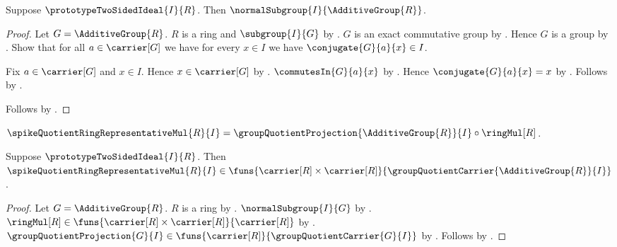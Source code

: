 \begin{proposition}\label{spike_two_sided_ideal_is_normal}
    Suppose $\prototypeTwoSidedIdeal{I}{R}$.
    Then $\normalSubgroup{I}{\AdditiveGroup{R}}$.
\end{proposition}
\begin{proof}
    Let $G=\AdditiveGroup{R}$.
    $R$ is a ring and $\subgroup{I}{G}$ by
        .
    $G$ is an exact commutative group by
        .
    Hence $G$ is a group by .
    Show that for all $a\in\carrier[G]$ we have for every $x\in I$ we have
        $\conjugate{G}{a}{x}\in I$.
    \begin{subproof}
        Fix $a\in\carrier[G]$ and $x\in I$.
        Hence $x\in\carrier[G]$ by
            .
        $\commutesIn{G}{a}{x}$ by
            .
        Hence $\conjugate{G}{a}{x}=x$ by
            .
        Follows by \auto.
    \end{subproof}
    Follows by .
\end{proof}

\begin{definition}\label{spike_quotient_ring_representative_mul}
    $\spikeQuotientRingRepresentativeMul{R}{I}=
        \groupQuotientProjection{\AdditiveGroup{R}}{I}
            \circ\ringMul[R]$.
\end{definition}

\begin{proposition}\label{spike_quotient_ring_representative_mul_type}
    Suppose $\prototypeTwoSidedIdeal{I}{R}$.
    Then
        $\spikeQuotientRingRepresentativeMul{R}{I}
            \in\funs{\carrier[R]\times\carrier[R]}{
                \groupQuotientCarrier{\AdditiveGroup{R}}{I}}$.
\end{proposition}
\begin{proof}
    Let $G=\AdditiveGroup{R}$.
    $R$ is a ring by .
    $\normalSubgroup{I}{G}$ by
        .
    $\ringMul[R]\in
        \funs{\carrier[R]\times\carrier[R]}{\carrier[R]}$ by
        .
    $\groupQuotientProjection{G}{I}\in
        \funs{\carrier[R]}{\groupQuotientCarrier{G}{I}}$ by
        .
    Follows by
        .
\end{proof}

